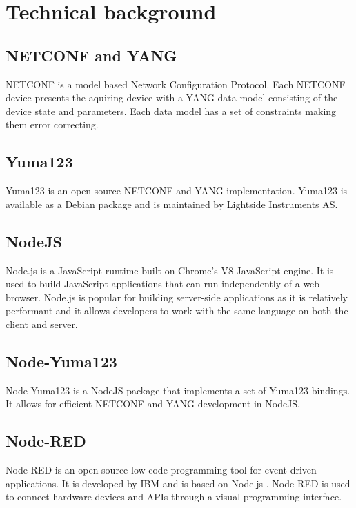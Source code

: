 \documentclass[12pt]{article}
\begin{document}
\section{Technical background}

\subsection{NETCONF and YANG}
NETCONF \cite{ennsNetworkConfigurationProtocol2011} is a model based Network Configuration Protocol.
Each NETCONF device presents the aquiring device with a YANG \cite{bjorklundYANG11Data2016} data model
consisting of the device state and parameters. 
Each data model has a set of constraints making them error correcting.

\subsection{Yuma123}
Yuma123 \cite{vassilevVlvassilevYuma1232025} is an open source NETCONF and YANG implementation.
Yuma123 is available as a Debian package and is maintained by Lightside Instruments AS.

\subsection{NodeJS}
Node.js \cite{NodejsRunJavaScript} is a JavaScript runtime built on Chrome's V8 JavaScript engine.
It is used to build JavaScript applications that can run independently of a web browser.
Node.js is popular for building server-side applications as it is relatively performant and 
it allows developers to work with the same language on both the client and server.

\subsection{Node-Yuma123}
Node-Yuma123 \cite{Nodeyuma1232025} is a NodeJS package that implements a set of Yuma123 bindings.
It allows for efficient NETCONF and YANG development in NodeJS.

\subsection{Node-RED}
Node-RED \cite{LowcodeProgrammingEventdriven} is an open source low code programming tool for event driven applications.
It is developed by IBM and is based on Node.js \cite{NodejsRunJavaScript}.
Node-RED is used to connect hardware devices and APIs through a visual programming interface.
\end{document}
